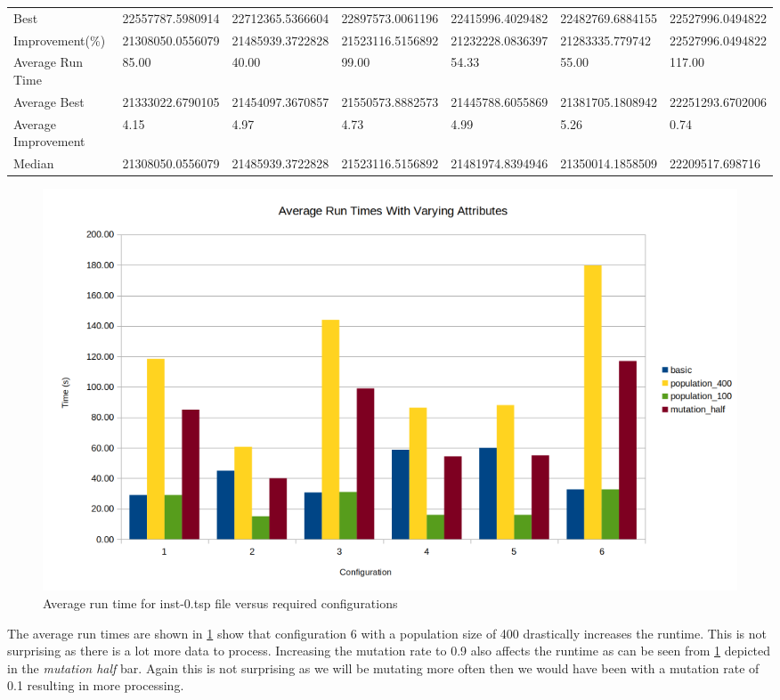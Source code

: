 \begin{table}[H]
{\begin{tabular}{lllllll}
\cellcolor[HTML]{ECF4FF}Best                & 22557787.5980914 & 22712365.5366604 & 22897573.0061196 & 22415996.4029482 & 22482769.6884155 & 22527996.0494822 \\
\cellcolor[HTML]{ECF4FF}Improvement(\%)     & 21308050.0556079 & 21485939.3722828 & 21523116.5156892 & 21232228.0836397 & 21283335.779742  & 22527996.0494822 \\
\rowcolor[HTML]{CBCEFB} 
\cellcolor[HTML]{DAE8FC}Average Run Time    & 85.00            & 40.00            & 99.00            & 54.33            & 55.00            & 117.00           \\
\rowcolor[HTML]{CBCEFB} 
\cellcolor[HTML]{DAE8FC}Average Best        & 21333022.6790105 & 21454097.3670857 & 21550573.8882573 & 21445788.6055869 & 21381705.1808942 & 22251293.6702006 \\
\rowcolor[HTML]{CBCEFB} 
\cellcolor[HTML]{DAE8FC}Average Improvement & 4.15             & 4.97             & 4.73             & 4.99             & 5.26             & 0.74             \\
\rowcolor[HTML]{CBCEFB} 
\cellcolor[HTML]{DAE8FC}Median              & 21308050.0556079 & 21485939.3722828 & 21523116.5156892 & 21481974.8394946 & 21350014.1858509 & 22209517.698716 
\end{tabular}%
}
\end{table}

\begin{figure}[H]
\vspace{-5pt}
\centering
\includegraphics[width=1.0\textwidth]{images/inst-0-run-time.png}
\caption{\label{fig:inst-0-run-time}Average run time for inst-0.tsp file versus required configurations}
\end{figure}

The average run times are shown in \ref{fig:inst-0-run-time} show that configuration 6 with a population size of 400 drastically increases the runtime. This is not surprising as there is a lot more data to process.
Increasing the mutation rate to 0.9 also affects the runtime as can be seen from \ref{fig:inst-0-run-time} depicted in the \textit{mutation half} bar. Again this is not surprising as we will be mutating more often then we would have been with a mutation rate of 0.1 resulting in more processing.

